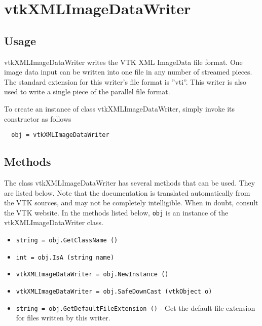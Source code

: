 \section{vtkXMLImageDataWriter}

\subsection{Usage}

 vtkXMLImageDataWriter writes the VTK XML ImageData file format.
 One image data input can be written into one file in any number of
 streamed pieces.  The standard extension for this writer's file
 format is ''vti''.  This writer is also used to write a single piece
 of the parallel file format.

To create an instance of class vtkXMLImageDataWriter, simply
invoke its constructor as follows
\begin{verbatim}
  obj = vtkXMLImageDataWriter
\end{verbatim}
\subsection{Methods}

The class vtkXMLImageDataWriter has several methods that can be used.
  They are listed below.
Note that the documentation is translated automatically from the VTK sources,
and may not be completely intelligible.  When in doubt, consult the VTK website.
In the methods listed below, \verb|obj| is an instance of the vtkXMLImageDataWriter class.
\begin{itemize}
\item  \verb|string = obj.GetClassName ()|

\item  \verb|int = obj.IsA (string name)|

\item  \verb|vtkXMLImageDataWriter = obj.NewInstance ()|

\item  \verb|vtkXMLImageDataWriter = obj.SafeDownCast (vtkObject o)|

\item  \verb|string = obj.GetDefaultFileExtension ()| -  Get the default file extension for files written by this writer.

\end{itemize}
